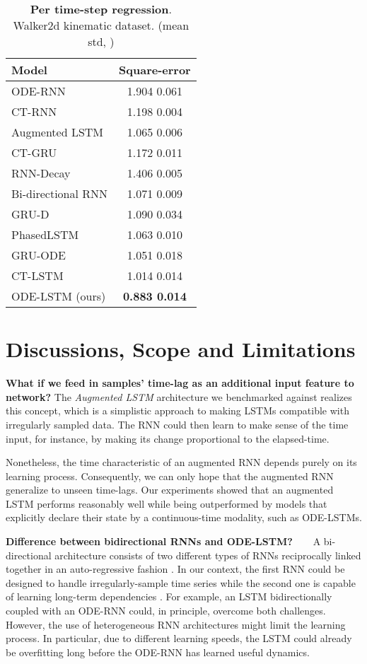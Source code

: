 \documentclass{article}
\makeatletter
\def\adl@drawiv#1#2#3{\hskip.5\tabcolsep
    \xleaders#3{#2.5\@tempdimb #1{1}#2.5\@tempdimb}#2\z@ plus1fil minus1fil\relax
    \hskip.5\tabcolsep}
\newcommand{\cdashlinelr}[1]{\noalign{\vskip\aboverulesep
        \global\let\@dashdrawstore\adl@draw
        \global\let\adl@draw\adl@drawiv}
    \cdashline{#1}
    \noalign{\global\let\adl@draw\@dashdrawstore
        \vskip\belowrulesep}}
\makeatother
\begin{document}
\begin{table}[H]
\vspace{-4mm}
    \centering
     \caption{\textbf{Per time-step regression}. Walker2d kinematic dataset. (mean  std, )}
     \begin{tabular}{lc}
     \toprule
     Model & Square-error \\
\hline
ODE-RNN & 1.904  0.061 \\
CT-RNN & 1.198  0.004 \\
Augmented LSTM & 1.065  0.006 \\
CT-GRU & 1.172  0.011 \\
RNN-Decay & 1.406  0.005 \\
Bi-directional RNN & 1.071  0.009 \\
GRU-D & 1.090  0.034 \\
PhasedLSTM & 1.063  0.010 \\
GRU-ODE & 1.051  0.018 \\
CT-LSTM & 1.014  0.014 \\
     \cdashlinelr{1-2} 
ODE-LSTM (ours) & \textbf{0.883  0.014} \\
     \bottomrule
     \end{tabular}
 \label{tab:real_walker}
\end{table}






\section{Discussions, Scope and Limitations}
\textbf{What if we feed in samples' time-lag as an additional input feature to network?} The \textit{Augmented LSTM} architecture we benchmarked against realizes this concept, which is a simplistic approach to making LSTMs compatible with irregularly sampled data. The RNN could then learn to make sense of the time input, for instance, by making its change proportional to the elapsed-time. 

Nonetheless, the time characteristic of an augmented RNN depends purely on its learning process. Consequently, we can only hope that the augmented RNN generalize to unseen time-lags. Our experiments showed that an augmented LSTM performs reasonably well while being outperformed by models that explicitly declare their state by a continuous-time modality, such as ODE-LSTMs.

\textbf{Difference between bidirectional RNNs and ODE-LSTM?~~~} 
A bi-directional architecture consists of two different types of RNNs reciprocally linked together in an auto-regressive fashion \cite{schuster1997bidirectional}. In our context, the first RNN could be designed to handle irregularly-sample time series while the second one is capable of learning long-term dependencies \cite{cao2018brits}. For example, an LSTM bidirectionally coupled with an ODE-RNN could, in principle, overcome both challenges. However, the use of heterogeneous RNN architectures might limit the learning process. In particular, due to different learning speeds, the LSTM could already be overfitting long before the ODE-RNN has learned useful dynamics. 
\end{document}
